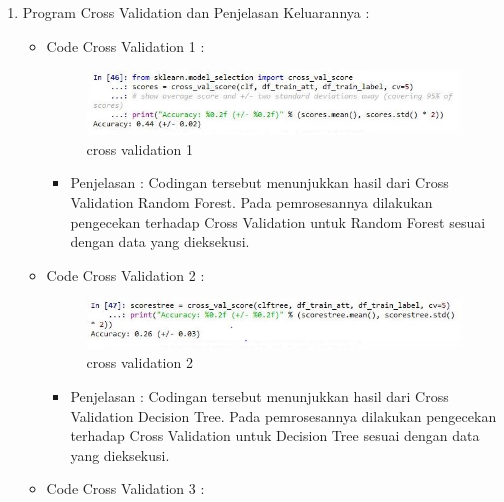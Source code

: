 \begin{enumerate}
\par
\par
\item Program Cross Validation dan Penjelasan Keluarannya :
\begin{itemize}
\item Code Cross Validation 1 :
\par
\begin{figure}[ht]
\centering
\includegraphics[scale=0.2]{figures/cross1.jpg}
\caption{cross validation 1}
\label{contoh}
\end{figure}
\par
\begin{itemize}
\item Penjelasan : Codingan tersebut menunjukkan hasil dari Cross Validation Random Forest. Pada pemrosesannya dilakukan pengecekan terhadap Cross Validation untuk Random Forest sesuai dengan data yang dieksekusi.
\par 
\par
\end{itemize}
\item Code Cross Validation 2  :
\par
\begin{figure}[ht]
\centering
\includegraphics[scale=0.2]{figures/cross2.jpg}
\caption{cross validation 2}
\label{contoh}
\end{figure}
\par
\begin{itemize}
\item Penjelasan : Codingan tersebut menunjukkan hasil dari Cross Validation Decision Tree. Pada pemrosesannya dilakukan pengecekan terhadap Cross Validation untuk Decision Tree sesuai dengan data yang dieksekusi.
\par
\par
\end{itemize}
\item Code Cross Validation 3 :
\par
\begin{figure}[ht]
\centering

\end{figure}
\end{itemize}
\end{enumerate}
